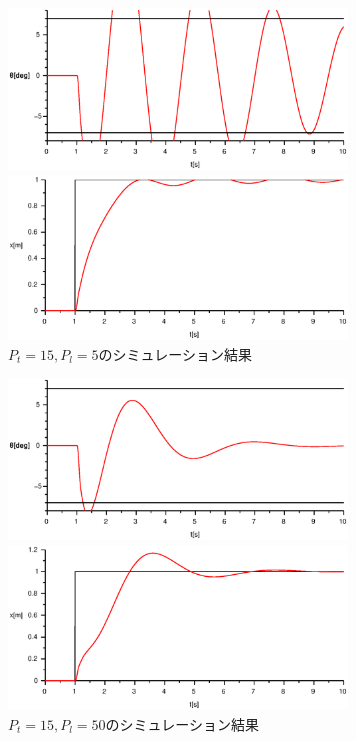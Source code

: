 \documentclass[titlepage]{jsarticle}
\begin{document}
            \begin{figure}[h]
                \begin{minipage}{0.5\hsize}
                    \centering
                    \includegraphics[width=9cm]{img/P15-5t.eps}
                \end{minipage}
                \begin{minipage}{0.5\hsize}
                    \centering
                    \includegraphics[width=9cm]{img/P15-5x.eps}
                \end{minipage}
                \caption{$P_t = 15, P_l = 5$のシミュレーション結果}
                \label{fig:p15-5}
            \end{figure}
            \begin{figure}[h]
                \begin{minipage}{0.5\hsize}
                    \centering
                    \includegraphics[width=9cm]{img/P15-50t.eps}
                \end{minipage}
                \begin{minipage}{0.5\hsize}
                    \centering
                    \includegraphics[width=9cm]{img/P15-50x.eps}
                \end{minipage}
                \caption{$P_t = 15, P_l = 50$のシミュレーション結果}
                \label{fig:p15-50}
            \end{figure}
\end{document}
